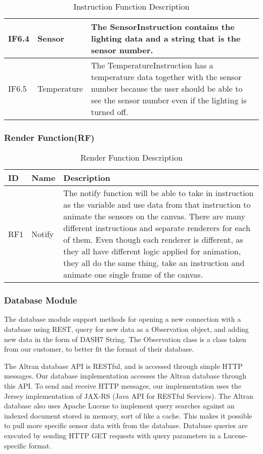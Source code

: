 \documentclass[../document]{subfiles}
\begin{document}
\begin{table}[H]
\caption{Instruction Function Description}
\centering
\begin{tabularx}{\textwidth}{|L{1.2cm}|L{3.5cm}|X|}
	\hline
	IF6.4
	&Sensor
	&The SensorInstruction contains the lighting data and a string that is the sensor number.
	\\ \hline IF6.5
	&Temperature
	&The TemperatureInstruction has a temperature data together with the sensor number because the user should be able to see the sensor number even if the lighting is turned off.
	\\ \hline 
\end{tabularx}
\end{table}

\subsubsection{Render Function(RF)}
\begin{table}[H]
\caption{Render Function Description}
\centering
\begin{tabularx}{\textwidth}{|L{1.2cm}|L{3.5cm}|X|}
	\hline
	ID
	&Name
	&Description
	\\ \hline RF1
	&Notify
	&The notify function will be able to take in instruction as the variable and use data from that instruction to animate the sensors on the canvas. There are many different instructions and separate renderers for each of them. Even though each renderer is different, as they all have different logic applied for animation, they all do the same thing, take an instruction and animate one single frame of the canvas.
	\\ \hline 
\end{tabularx}
\end{table}

\subsubsection{Database Module}
The database module support methods for opening a new connection with a database using \gls{REST}, query for new data as a Observation object, and adding new data in the form of DASH7 String. The Observation class is a class taken from our customer, to better fit the format of their database.

The \gls{Altran} database \gls{API} is RESTful, and is accessed through simple \gls{HTTP} messages. Our database implementation accesses the \gls{Altran} database through this \gls{API}. To send and receive \gls{HTTP} messages, our implementation uses the Jersey implementation of JAX-RS (\gls{Java} \gls{API} for RESTful Services). The \gls{Altran} database also uses Apache Lucene to implement query searches against an indexed document stored in memory, sort of like a cache. This makes it possible to pull more specific sensor data with from the database. Database queries are executed by sending \gls{HTTP} GET requests with query parameters in a Lucene-specific format.
\end{document}
